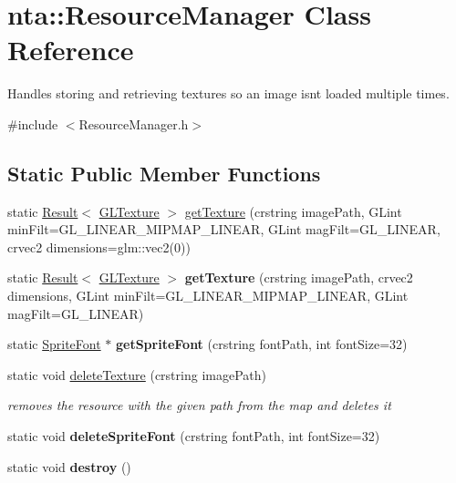 \hypertarget{classnta_1_1ResourceManager}{}\section{nta\+:\+:Resource\+Manager Class Reference}
\label{classnta_1_1ResourceManager}


Handles storing and retrieving textures so an image isn\textquotesingle{}t loaded multiple times.  




{\ttfamily \#include $<$Resource\+Manager.\+h$>$}

\subsection*{Static Public Member Functions}
\begin{DoxyCompactItemize}
\item 
static \hyperlink{classnta_1_1Result}{Result}$<$ \hyperlink{structnta_1_1GLTexture}{G\+L\+Texture} $>$ \hyperlink{classnta_1_1ResourceManager_a60911bfeef0df3802c6ef03cc10fb5c1}{get\+Texture} (crstring image\+Path, G\+Lint min\+Filt=G\+L\+\_\+\+L\+I\+N\+E\+A\+R\+\_\+\+M\+I\+P\+M\+A\+P\+\_\+\+L\+I\+N\+E\+AR, G\+Lint mag\+Filt=G\+L\+\_\+\+L\+I\+N\+E\+AR, crvec2 dimensions=glm\+::vec2(0))
\item 
\mbox{\label{classnta_1_1ResourceManager_ae14b4380aae490abd97d0bb1073d3a0b}} 
static \hyperlink{classnta_1_1Result}{Result}$<$ \hyperlink{structnta_1_1GLTexture}{G\+L\+Texture} $>$ {\bfseries get\+Texture} (crstring image\+Path, crvec2 dimensions, G\+Lint min\+Filt=G\+L\+\_\+\+L\+I\+N\+E\+A\+R\+\_\+\+M\+I\+P\+M\+A\+P\+\_\+\+L\+I\+N\+E\+AR, G\+Lint mag\+Filt=G\+L\+\_\+\+L\+I\+N\+E\+AR)
\item 
\mbox{\label{classnta_1_1ResourceManager_a0411e5cf357d6d285820338d92d06a0e}} 
static \hyperlink{classnta_1_1SpriteFont}{Sprite\+Font} $\ast$ {\bfseries get\+Sprite\+Font} (crstring font\+Path, int font\+Size=32)
\item 
\mbox{\label{classnta_1_1ResourceManager_a2f9971f86fc9e50d7a62aa5f6f91a489}} 
static void \hyperlink{classnta_1_1ResourceManager_a2f9971f86fc9e50d7a62aa5f6f91a489}{delete\+Texture} (crstring image\+Path)
\begin{DoxyCompactList}\small\item\em removes the resource with the given path from the map and deletes it \end{DoxyCompactList}\item 
\mbox{\label{classnta_1_1ResourceManager_a16c549cb1496d1f38b5900258b0624c7}} 
static void {\bfseries delete\+Sprite\+Font} (crstring font\+Path, int font\+Size=32)
\item 
\mbox{\label{classnta_1_1ResourceManager_a26ff6f1cb4044d8f47fa5db9a3df2514}} 
static void {\bfseries destroy} ()
\end{DoxyCompactItemize}
